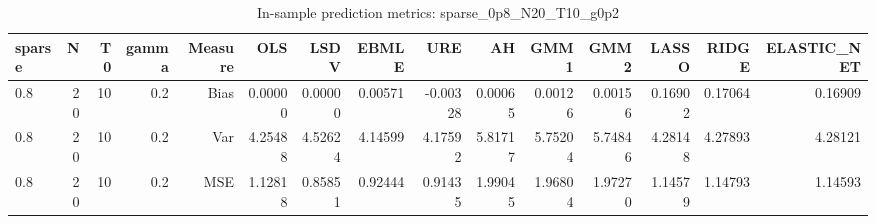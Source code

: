 \begin{table}[!htbp]\centering
\caption{In-sample prediction metrics: sparse_0p8_N20_T10_g0p2}
\label{tab:table2_sparse_0p8_N20_T10_g0p2}
\begin{tabular}{lrrrrrrrrrrrrrr}
\hline
sparse & N & T0 & gamma & Measure & OLS & LSDV & EBMLE & URE & AH & GMM1 & GMM2 & LASSO & RIDGE & ELASTIC_NET \\
\hline
0.8 & 20 & 10 & 0.2 & Bias & 0.00000 & 0.00000 & 0.00571 & -0.00328 & 0.00065 & 0.00126 & 0.00156 & 0.16902 & 0.17064 & 0.16909 \\
0.8 & 20 & 10 & 0.2 & Var & 4.25488 & 4.52624 & 4.14599 & 4.17592 & 5.81717 & 5.75204 & 5.74846 & 4.28148 & 4.27893 & 4.28121 \\
0.8 & 20 & 10 & 0.2 & MSE & 1.12818 & 0.85851 & 0.92444 & 0.91435 & 1.99045 & 1.96804 & 1.97270 & 1.14579 & 1.14793 & 1.14593 \\
\hline
\end{tabular}
\end{table}

